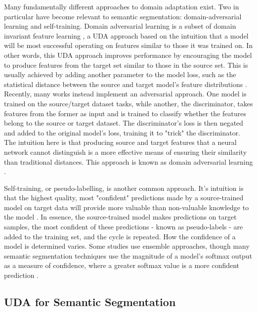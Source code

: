 \documentclass[a4paper,12pt]{report}
\begin{document}
Many fundamentally different approaches to domain adaptation exist. Two in particular have become relevant to semantic segmentation: domain-adversarial learning and self-training. Domain adversarial learning is a subset of domain invariant feature learning \cite{wilson_survey_2020}, a UDA approach based on the intuition that a model will be most successful operating on features similar to those it was trained on. In other words, this UDA approach improves performance by encouraging the model to produce features from the target set similar to those in the source set. This is usually achieved by adding another parameter to the model loss, such as the statistical distance between the source and target model's feature distributions \cite{gretton_kernel_2006} \cite{sun_return_2015}. Recently, many works \cite{ganin_unsupervised_2015} \cite{ganin_domain-adversarial_2016} instead implement an adversarial \cite{goodfellow_generative_2014} approach. One model is trained on the source/target dataset tasks, while another, the discriminator, takes features from the former as input and is trained to classify whether the features belong to the source or target dataset. The discriminator's loss is then negated and added to the original model's loss, training it to "trick" the discriminator. The intuition here is that producing source and target features that a neural network cannot distinguish is a more effective means of ensuring their similarity than traditional distances. This approach is known as domain adversarial learning \cite{ganin_domain-adversarial_2016}.

Self-training, or pseudo-labelling, is another common approach. It's intuition is that the highest quality, most "confident" predictions made by a source-trained model on target data will provide more valuable than non-valuable knowledge to the model \cite{wilson_survey_2020} \cite{kamnitsas_transductive_2021}. In essence, the source-trained model makes predictions on target samples, the most confident of these predictions - known as pseudo-labels - are added to the training set, and the cycle is repeated. How the confidence of a model is determined varies. Some studies use ensemble approaches, though many semantic segmentation techniques use the magnitude of a model's softmax output as a measure of confidence, where a greater softmax value is a more confident prediction \cite{zou_domain_2018}.


\subsection*{UDA for Semantic Segmentation}
\end{document}
